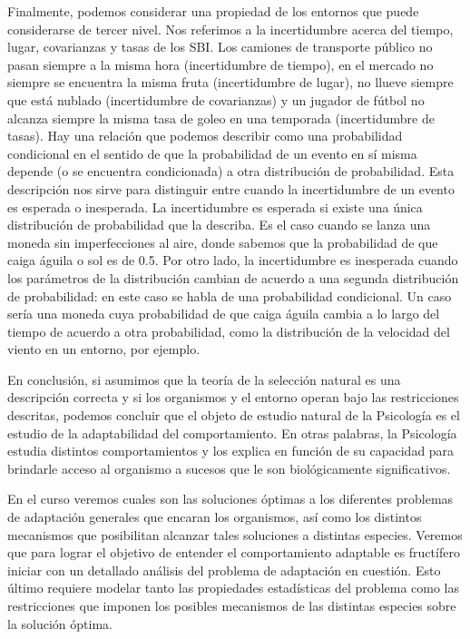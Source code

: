 \documentclass[
  a4paper,
  DIV=11,
  numbers=noendperiod]{scrreprt}
\begin{document}
Finalmente, podemos considerar una propiedad de los entornos que puede
considerarse de tercer nivel. Nos referimos a la incertidumbre acerca
del tiempo, lugar, covarianzas y tasas de los SBI. Los camiones de
transporte público no pasan siempre a la misma hora (incertidumbre de
tiempo), en el mercado no siempre se encuentra la misma fruta
(incertidumbre de lugar), no llueve siempre que está nublado
(incertidumbre de covarianzas) y un jugador de fútbol no alcanza siempre
la misma tasa de goleo en una temporada (incertidumbre de tasas). Hay
una relación que podemos describir como una probabilidad condicional en
el sentido de que la probabilidad de un evento en sí misma depende (o se
encuentra condicionada) a otra distribución de probabilidad. Esta
descripción nos sirve para distinguir entre cuando la incertidumbre de
un evento es esperada o inesperada. La incertidumbre es esperada si
existe una única distribución de probabilidad que la describa. Es el
caso cuando se lanza una moneda sin imperfecciones al aire, donde
sabemos que la probabilidad de que caiga águila o sol es de 0.5. Por
otro lado, la incertidumbre es inesperada cuando los parámetros de la
distribución cambian de acuerdo a una segunda distribución de
probabilidad: en este caso se habla de una probabilidad condicional. Un
caso sería una moneda cuya probabilidad de que caiga águila cambia a lo
largo del tiempo de acuerdo a otra probabilidad, como la distribución de
la velocidad del viento en un entorno, por ejemplo.

En conclusión, si asumimos que la teoría de la selección natural es una
descripción correcta y si los organismos y el entorno operan bajo las
restricciones descritas, podemos concluir que el objeto de estudio
natural de la Psicología es el estudio de la adaptabilidad del
comportamiento. En otras palabras, la Psicología estudia distintos
comportamientos y los explica en función de su capacidad para brindarle
acceso al organismo a sucesos que le son biológicamente significativos.

En el curso veremos cuales son las soluciones óptimas a los diferentes
problemas de adaptación generales que encaran los organismos, así como
los distintos mecanismos que posibilitan alcanzar tales soluciones a
distintas especies. Veremos que para lograr el objetivo de entender el
comportamiento adaptable es fructífero iniciar con un detallado análisis
del problema de adaptación en cuestión. Esto último requiere modelar
tanto las propiedades estadísticas del problema como las restricciones
que imponen los posibles mecanismos de las distintas especies sobre la
solución óptima.
\end{document}
